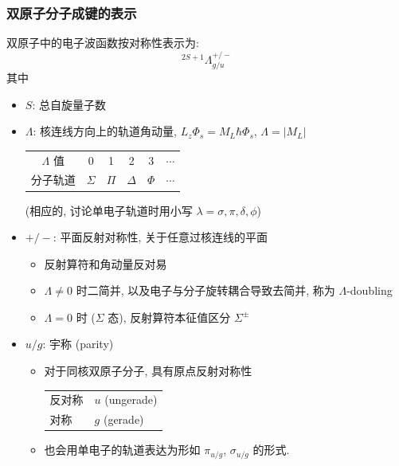\documentclass[10pt,a4paper,twocolumn]{article} %
\numberwithin{equation}{section} %
\begin{document}
\subsubsection{双原子分子成键的表示} %
\label{sub:repr_for_diatom}
双原子中的电子波函数按对称性表示为: 
\begin{equation}
	^{2S+1}\Lambda_{g/u}^{+/-}
\end{equation}
其中
\begin{itemize}
	\item $S$: 总自旋量子数
	\item $\Lambda$: 核连线方向上的轨道角动量, 
	$L_z\Phi_s = M_L\hbar\Phi_s$, $\Lambda = |M_L|$ 
	\begin{center}
	\begin{tabular}{c|ccccc}
	$\Lambda$ 值 & 0 & 1 & 2 & 3 & $\cdots$\\
	分子轨道 & $\Sigma$ & $\Pi$ & $\Delta$ & $\Phi$ & $\cdots$
	\end{tabular}		
	\end{center}
	(相应的, 讨论单电子轨道时用小写 $\lambda = \sigma, \pi, \delta, \phi$)
	\item $+/-$: 平面反射对称性, 关于任意过核连线的平面 
	\begin{itemize}
		\item 反射算符和角动量反对易
		\item $\Lambda \neq 0$ 时二简并, 以及电子与分子旋转耦合导致去简并, 
		称为 $\Lambda$-doubling
		\item $\Lambda = 0$ 时 ($\Sigma$ 态), 反射算符本征值区分 $\Sigma^\pm$
	\end{itemize}
	\item $u/g$: 宇称 (parity)
	\begin{itemize}
		\item 对于同核双原子分子, 具有原点反射对称性
		\begin{center}
		\begin{tabular}{ll}
		反对称 & $u$ (ungerade) \\
		对称   & $g$ (gerade)
		\end{tabular}
		\end{center}
		\item 也会用单电子的轨道表达为形如 $\pi_{u/g}$, $\sigma_{u/g}$ 的形式.\\
		\begin{minipage}[c]{0.3\linewidth}
			\centering

\end{minipage}
\end{itemize}
\end{itemize}
\end{document}
